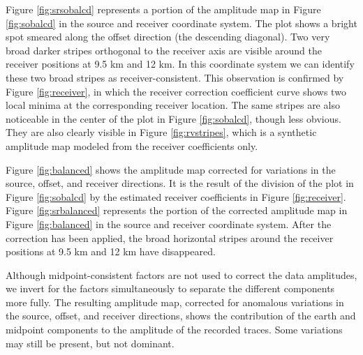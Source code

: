 \par
Figure \ref{fig:srsobalcd} represents a portion of the amplitude map in Figure 
\ref{fig:sobalcd} in the source and receiver coordinate system. The plot shows
a bright spot smeared along the offset direction (the descending diagonal). 
Two very broad darker stripes orthogonal to the receiver axis are visible 
around the receiver positions at 9.5 km and 12 km. In this coordinate system 
we can identify these two broad stripes as receiver-consistent. This 
observation is confirmed by Figure \ref{fig:receiver}, in which the receiver 
correction coefficient curve shows two local minima at the corresponding 
receiver location. The same stripes are also noticeable in the center of the 
plot in Figure \ref{fig:sobalcd}, though less obvious. They are also clearly 
visible in Figure \ref{fig:rvstripes}, which is a synthetic amplitude map modeled 
from the receiver coefficients only.



\par
Figure \ref{fig:balanced} shows the amplitude map corrected for variations
in the source, offset, and receiver directions. It is the result of the
division of the plot in Figure \ref{fig:sobalcd} by the estimated receiver
coefficients in Figure \ref{fig:receiver}. Figure \ref{fig:srbalanced} represents
the portion of the corrected amplitude map in Figure \ref{fig:balanced} in the
source and receiver coordinate system. After the correction has been applied,
the broad horizontal stripes around the receiver positions at 9.5 km and 
12 km have disappeared.



\par
Although midpoint-consistent factors are not used to correct the data
amplitudes, we invert for the factors simultaneously to separate the
different components more fully.
The resulting amplitude map, corrected for anomalous variations in the source, 
offset, and receiver directions, shows the contribution of the earth and 
midpoint components to the amplitude of the recorded traces. Some variations 
may still be present, but not dominant.


